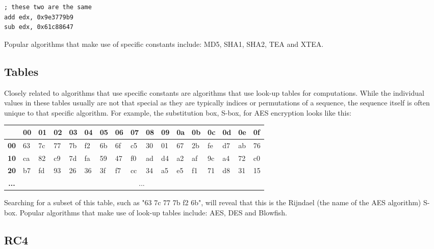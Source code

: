 \documentclass[twocolumn]{article}
\begin{document}
\begin{verbatim}
; these two are the same
add edx, 0x9e3779b9
sub edx, 0x61c88647
\end{verbatim}

\vspace*{-0.7\baselineskip}
Popular algorithms that make use of specific constants include: MD5, SHA1, SHA2, TEA and XTEA.
\vspace*{-1.2\baselineskip}


\subsection*{Tables}
\vspace*{-0.4\baselineskip}

Closely related to algorithms that use specific constants are algorithms that use look-up tables for computations. While the individual values in these tables usually are not that special as they are typically indices or permutations of a sequence, the sequence itself is often unique to that specific algorithm. For example, the substitution box, S-box, for AES encryption looks like this:

\begin{table}[!h]
\setlength{\tabcolsep}{3pt}
    \tiny
    \begin{tabular}{|>{\bfseries}c|l|l|l|l|l|l|l|l|l|l|l|l|l|l|l|l|}
\hline
   & \textbf{00} & \textbf{01} & \textbf{02} & \textbf{03} & \textbf{04} & \textbf{05} & \textbf{06} & \textbf{07} & \textbf{08} & \textbf{09} & \textbf{0a} & \textbf{0b} & \textbf{0c} & \textbf{0d} & \textbf{0e} & \textbf{0f} \\ \hline
00 & 63 & 7c & 77 & 7b & f2 & 6b & 6f & c5 & 30 & 01 & 67 & 2b & fe & d7 & ab & 76 \\ \hline
10 & ca & 82 & c9 & 7d & fa & 59 & 47 & f0 & ad & d4 & a2 & af & 9c & a4 & 72 & c0 \\ \hline
20 & b7 & fd & 93 & 26 & 36 & 3f & f7 & cc & 34 & a5 & e5 & f1 & 71 & d8 & 31 & 15 \\ 
... & \multicolumn{16}{c}{...}
    \end{tabular}
\end{table}

Searching for a subset of this table, such as "63 7c 77 7b f2 6b", will reveal that this is the Rijndael (the name of the AES algorithm) S-box. Popular algorithms that make use of look-up tables include: AES, DES and Blowfish.


\subsection*{RC4}
\end{document}
